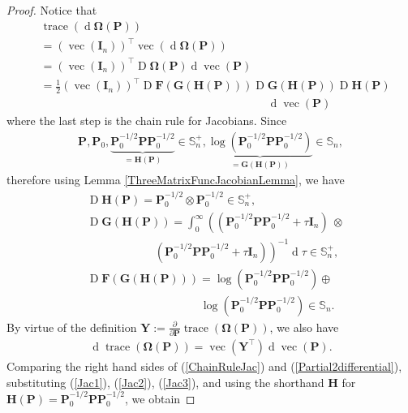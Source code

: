 \documentclass[letterpaper,10pt,twocolumn,conference]{ieeeconf}
\newcommand{\bbP}{{\bm{P}}}
\newcommand{\bbI}{\bm{I}}
\newcommand{\bbF}{\bm{F}}
\newcommand{\bbG}{\bm{G}}
\newcommand{\bbH}{\bm{H}}
\newcommand{\bbY}{\bm{Y}}
\newcommand{\bbOmega}{\bm{\Omega}}
\newcommand{\tr}{\operatorname{trace}}
\newcommand{\Jacobian}{\operatorname{D}}
\newcommand{\differential}{\operatorname{d}}
\renewcommand{\vec}{\operatorname{vec}}
\begin{document}
\begin{proof}
Notice that
{\small{\begin{align}
&\tr\left(\differential\bbOmega(\bbP)\right) \nonumber\\
&= \left(\vec(\bbI_{n})\right)^{\!\top\!\!} \vec\left(\differential\bbOmega(\bbP)\right) \nonumber\\
&= \left(\vec(\bbI_{n})\right)^{\!\top\!\!} \Jacobian\bbOmega(\bbP) \differential\vec(\bbP) \nonumber\\
&= \frac{1}{2}\left(\vec(\bbI_{n})\right)^{\!\top\!\!} \Jacobian\bbF\left(\bbG\left(\bbH(\bbP)\right)\right) \Jacobian\bbG\left(\bbH(\bbP)\right) \Jacobian\bbH(\bbP) \nonumber\\
&\qquad\qquad\qquad\qquad\qquad\qquad\qquad\qquad\qquad\qquad\differential\vec(\bbP)	\label{ChainRuleJac}
\end{align}}}
\noindent where the last step is the chain rule for Jacobians. Since
\begin{eqnarray*}
\bbP,\allowbreak\bbP_{0},\underbrace{\bbP_{0}^{-1/2}\bbP\bbP_{0}^{-1/2}}_{=\bbH(\bbP)} \in \mathbb{S}_{n}^{+},	\underbrace{\log\left(\bbP_{0}^{-1/2}\bbP\bbP_{0}^{-1/2}\right)}_{=\bbG(\bbH(\bbP))} \in \mathbb{S}_{n},
\end{eqnarray*}
therefore using Lemma \ref{ThreeMatrixFuncJacobianLemma}, we have 
\begin{align}
&\Jacobian\bbH(\bbP) = \bbP_{0}^{-1/2} \otimes \bbP_{0}^{-1/2} \in \mathbb{S}_{n}^{+}, \label{Jac1}\\
&\Jacobian\bbG\left(\bbH(\bbP)\right) = \displaystyle\int_{0}^{\infty}\!\!\left((\bbP_{0}^{-1/2}\bbP\bbP_{0}^{-1/2} + \tau\bbI_{n}) \:\otimes \right. \nonumber\\
&\qquad\qquad\qquad\left.(\bbP_{0}^{-1/2}\bbP\bbP_{0}^{-1/2} + \tau\bbI_{n})\right)^{-1}\differential\tau \in \mathbb{S}_{n}^{+}, \label{Jac2}\\
& \Jacobian\bbF\left(\bbG\left(\bbH(\bbP)\right)\right) = \log\left(\bbP_{0}^{-1/2}\bbP\bbP_{0}^{-1/2}\right) \oplus \nonumber\\
&\qquad\qquad\qquad\qquad\qquad\log\left(\bbP_{0}^{-1/2}\bbP\bbP_{0}^{-1/2}\right) \in \mathbb{S}_{n}. \label{Jac3}	
\end{align}
By virtue of the definition $\bbY := \frac{\partial}{\partial\bbP}\tr\left(\bbOmega(\bbP)\right)$, we also have
\begin{eqnarray}
\differential\tr(\bbOmega(\bbP)) = \vec\left(\bbY^{\top}\right)	\differential\vec(\bbP).
\label{Partial2differential}
\end{eqnarray}
Comparing the right hand sides of (\ref{ChainRuleJac}) and (\ref{Partial2differential}), substituting (\ref{Jac1}), (\ref{Jac2}), (\ref{Jac3}), and using the shorthand $\bbH$ for $\bbH(\bbP) = \bbP_{0}^{-1/2}\bbP\bbP_{0}^{-1/2}$, we obtain

\end{proof}
\end{document}
